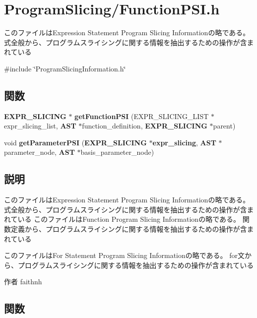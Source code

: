 \section{ProgramSlicing/FunctionPSI.h}
\label{_function_p_s_i_8h}


このファイルはExpression Statement Program Slicing Informationの略である。 式全般から、プログラムスライシングに関する情報を抽出するための操作が含まれている  


{\ttfamily \#include \char`\"{}ProgramSlicingInformation.h\char`\"{}}\par
\subsection*{関数}
\begin{DoxyCompactItemize}
\item 
{\bf EXPR\_\-SLICING} $\ast$ {\bf getFunctionPSI} (EXPR\_\-SLICING\_\-LIST $\ast$expr\_\-slicing\_\-list, {\bf AST} $\ast$function\_\-definition, {\bf EXPR\_\-SLICING} $\ast$parent)
\item 
void {\bf getParameterPSI} ({\bf EXPR\_\-SLICING} $\ast${\bf expr\_\-slicing}, {\bf AST} $\ast$parameter\_\-node, {\bf AST} $\ast$basis\_\-parameter\_\-node)
\end{DoxyCompactItemize}


\subsection{説明}
このファイルはExpression Statement Program Slicing Informationの略である。 式全般から、プログラムスライシングに関する情報を抽出するための操作が含まれている このファイルはFunction Program Slicing Informationの略である。 関数定義から、プログラムスライシングに関する情報を抽出するための操作が含まれている

このファイルはFor Statement Program Slicing Informationの略である。 for文から、プログラムスライシングに関する情報を抽出するための操作が含まれている

\begin{DoxyAuthor}{作者}
faithnh 
\end{DoxyAuthor}


\subsection{関数}
